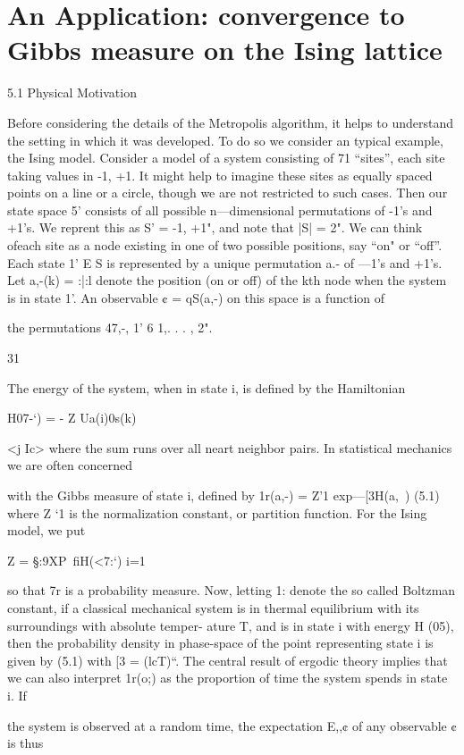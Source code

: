 
\chapter{An Application: convergence to Gibbs measure on the Ising lattice}
\label{cha:an-appl-conv}

5.1 Physical Motivation

Before considering the details of the Metropolis algorithm, it helps to understand the
setting in which it was developed. To do so we consider an typical example, the Ising model.
Consider a model of a system consisting of 71 “sites”, each site taking values in {-1, +1}. It might
help to imagine these sites as equally spaced points on a line or a circle, though we are not restricted
to such cases. Then our state space 5' consists of all possible n—dimensional permutations of -1’s
and +1’s. We reprent this as S’ = {-1, +1}", and note that |S| = 2". We can think ofeach site as
a node existing in one of two possible positions, say “on" or “off”. Each state 1' E S is represented
by a unique permutation a.- of —1’s and +1’s. Let a,-(k) = :|:l denote the position (on or off) of
the kth node when the system is in state 1'. An observable ¢ = qS(a,-) on this space is a function of

the permutations 47,-, 1' 6 {1,. . . , 2"}.

31

The energy of the system, when in state i, is deﬁned by the Hamiltonian

H07-‘) = - Z Ua(i)0s(k)

<j Ic>
where the sum runs over all neart neighbor pairs. In statistical mechanics we are often concerned

with the Gibbs measure of state i, deﬁned by
1r(a,-) = Z'1 exp{—[3H(a,~)} (5.1)
where Z ‘1 is the normalization constant, or partition function. For the Ising model, we put

Z = §:9XP{~ﬁH(<7:‘)}
i=1

so that 7r is a probability measure. Now, letting 1: denote the so called Boltzman constant, if a
classical mechanical system is in thermal equilibrium with its surroundings with absolute temper-
ature T, and is in state i with energy H (05), then the probability density in phase-space of the
point representing state i is given by (5.1) with [3 = (lcT)“. The central result of ergodic theory
implies that we can also interpret 1r(o;) as the proportion of time the system spends in state i. If

the system is observed at a random time, the expectation E,,¢ of any observable ¢ is thus

